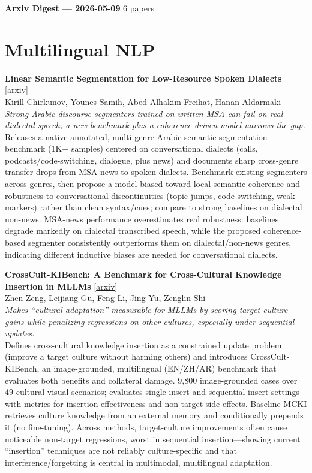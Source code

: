 \documentclass[12pt,letterpaper]{article}
\begin{document}
{\footnotesize\textbf{Arxiv Digest --- 2026-05-09} \hfill 6 papers}

\smallskip

\section*{Multilingual NLP}

{\small\textbf{Linear Semantic Segmentation for Low-Resource Spoken Dialects}} {\scriptsize[\href{https://arxiv.org/abs/2605.06276}{arxiv}]}\\
{\scriptsize Kirill Chirkunov, Younes Samih, Abed Alhakim Freihat, Hanan Aldarmaki}\\

{\small\textit{Strong Arabic discourse segmenters trained on written MSA can fail on real dialectal speech; a new benchmark plus a coherence-driven model narrows the gap.}}\\[1pt]
{\footnotesize Releases a native-annotated, multi-genre Arabic semantic-segmentation benchmark (1K+ samples) centered on conversational dialects (calls, podcasts/code-switching, dialogue, plus news) and documents sharp cross-genre transfer drops from MSA news to spoken dialects. Benchmark existing segmenters across genres, then propose a model biased toward local semantic coherence and robustness to conversational discontinuities (topic jumps, code-switching, weak markers) rather than clean syntax/cues; compare to strong baselines on dialectal non-news. MSA-news performance overestimates real robustness: baselines degrade markedly on dialectal transcribed speech, while the proposed coherence-based segmenter consistently outperforms them on dialectal/non-news genres, indicating different inductive biases are needed for conversational dialects.}

\medskip

{\small\textbf{CrossCult-KIBench: A Benchmark for Cross-Cultural Knowledge Insertion in MLLMs}} {\scriptsize[\href{https://arxiv.org/abs/2605.06115}{arxiv}]}\\
{\scriptsize Zhen Zeng, Leijiang Gu, Feng Li, Jing Yu, Zenglin Shi}\\

{\small\textit{Makes ``cultural adaptation'' measurable for MLLMs by scoring target-culture gains while penalizing regressions on other cultures, especially under sequential updates.}}\\[1pt]
{\footnotesize Defines cross-cultural knowledge insertion as a constrained update problem (improve a target culture without harming others) and introduces CrossCult-KIBench, an image-grounded, multilingual (EN/ZH/AR) benchmark that evaluates both benefits and collateral damage. 9,800 image-grounded cases over 49 cultural visual scenarios; evaluates single-insert and sequential-insert settings with metrics for insertion effectiveness and non-target side effects. Baseline MCKI retrieves culture knowledge from an external memory and conditionally prepends it (no fine-tuning). Across methods, target-culture improvements often cause noticeable non-target regressions, worst in sequential insertion---showing current ``insertion'' techniques are not reliably culture-specific and that interference/forgetting is central in multimodal, multilingual adaptation.}
\end{document}
